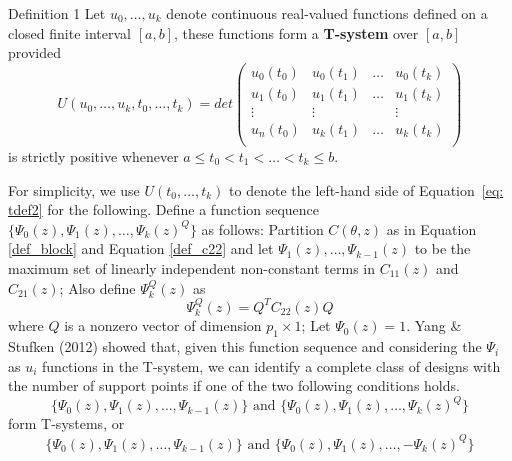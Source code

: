 \documentclass[12pt]{TD-CJS}
\begin{document}
\begin{theorem}{Definition 1}{}\label{deft}
    Let $u_0, \ldots, u_k$ denote continuous real-valued functions defined on a closed finite interval $[a,b]$, these functions form a \textbf{T-system} over $[a,b]$ provided  
\begin{equation}\label{eq: tdef2}
    U(u_0,\ldots,u_k, t_0,\ldots,t_k) = det\left ( \begin{array}{cccc}
u_0(t_0) &u_0(t_1) &\ldots &u_0(t_k) \\
u_1(t_0) &u_1(t_1) &\ldots &u_1(t_k) \\
\vdots & \vdots &&\vdots\\
u_n(t_0) &u_k(t_1) &\ldots &u_k(t_k) \\
\end{array}\right)
\end{equation}
     is strictly positive whenever $a\le t_0 <t_1< \ldots< t_k\le b$.
\end{theorem}
For simplicity, we use $U(t_0,\ldots,t_k)$ to denote the left-hand side of Equation~\eqref{eq: tdef2} for the following. 
Define a function sequence $\{\Psi_0(z),\Psi_1(z),\ldots, \Psi_k(z)^Q\}$ as follows: Partition $C(\theta,z)$ as in Equation \eqref{def_block} and Equation \eqref{def_c22} and let $\Psi_1(z),\ldots,\Psi_{k-1}(z)$ to be the maximum set of linearly independent non-constant terms in $C_{11}(z)$ and $C_{21}(z)$; Also define $\Psi^Q_{k}(z)$ as \[\Psi_k^Q(z) = Q^TC_{22}(z)Q\] where $Q$ is a nonzero vector of dimension $p_1\times 1$; Let $\Psi_0(z) = 1$. Yang \& Stufken (2012) showed that, given this function sequence  and considering the $\Psi_i$ as $u_i$ functions in the T-system, we can identify a complete class of designs with the number of support points if one of the two following conditions holds. %
\begin{equation}
    \{\Psi_0(z),\Psi_1(z),\ldots, \Psi_{k-1}(z)\} \text{ and }  \{\Psi_0(z),\Psi_1(z),\ldots, \Psi_k(z)^Q\}
    \label{eq: 3.5}
\end{equation} form T-systems, or\begin{equation}\label{eq: 3.6}
    \{\Psi_0(z),\Psi_1(z),\ldots,\Psi_{k-1}(z)\} \text{ and }  \{\Psi_0(z),\Psi_1(z),\ldots, -\Psi_k(z)^Q\} 
\end{equation}
\end{document}
